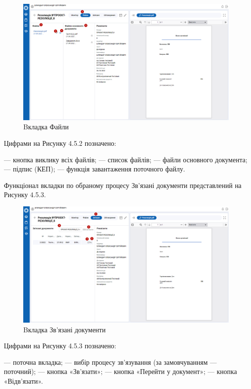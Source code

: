 \begin{figure}[!htbp]
\centerline{\includegraphics[width=\textwidth]{img/4.5.2.png}}
\caption{Bкладка Файли}
\end{figure}

Цифрами на Рисунку 4.5.2 позначено:

 --- кнопка виклику всіх файлів;
 --- список файлів;
 --- файли основного документа;
 --- підпис (КЕП);
 --- функція завантаження поточного файлу.

Функціонал вкладки по обраному процесу Зв’язані документи представлений на
Рисунку 4.5.3.

\begin{figure}[!htbp]
\centerline{\includegraphics[width=\textwidth]{img/4.5.3.png}}
\caption{Bкладка Зв’язані документи}
\end{figure}

Цифрами на Рисунку 4.5.3 позначено:

 --- поточна вкладка;
 --- вибір процесу зв’язування (за замовчуванням --- поточний);
 --- кнопка «Зв’язати»;
 --- кнопка «Перейти у документ»;
 --- кнопка «Відв’язати».

